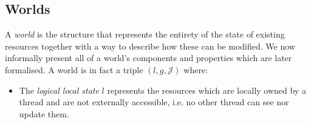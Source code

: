 \subsection{Worlds}

A \textit{world} is the structure that represents the entirety of the state of existing resources together with a way to describe how these can be modified. We now informally present all of a world's components and properties which are later formalised. A world is in fact a triple $(l, g, \mathcal{J})$ where:
\begin{itemize}
	\item The \textit{logical local state} $l$ represents the resources which are locally owned by a thread and are not externally accessible, i.e. no other thread can see nor update them.
\end{itemize}